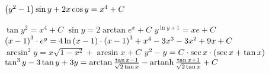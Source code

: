 \begin{enumsols}
		\item \( \left( y^2 - 1 \right) \sin{y} + 2x \cos{y} = x^4 + C \) %
		\item \( \tan{y^2} = x^4 + C \) %
		\itemstar \( \sin{y} = 2 \arctan{e^{x}} + C \) %
		\itemstar \( y^{\ln{y} + 1} = xe + C \) %
		\itemstar \( \left( x-1 \right)^3 \cdot e^{y} = 4\ln\left( x - 1 \right) \cdot \left( x-1 \right)^3 + x^4 - 3x^3 - 3x^2 + 9x + C \) %
		\itemstar \( \arcsin^2{y} = x \sqrt{1 - x^2} + \arcsin{x} + C \) %
		\itemstar \( y^2 - y = C \cdot \sec{x} \cdot \left( \sec{x} + \tan{x} \right) \) %
		\itemstar \( \tan^3{y} - 3\tan{y} + 3y = \arctan{\frac{\tan{x} - 1}{\sqrt{2 \tan{x}}}} - \operatorname{artanh}{\frac{\tan{x} + 1}{\sqrt{2 \tan{x}}}} + C \) %

	\end{enumsols}

